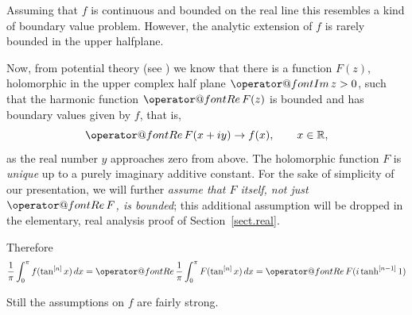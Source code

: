 \documentclass{amsart}
\makeatletter
\theoremstyle{plain}
\numberwithin{equation}{section}
\newcommand{\R}{{\mathbb  R}}
\renewcommand{\Re}{{\operator@font Re\,}}
\renewcommand{\Im}{{\operator@font Im\,}}
\makeatother
\begin{document}
Assuming that $f$ is continuous and bounded on the real line this resembles a kind of boundary value problem. However, the analytic extension of $f$ is rarely bounded in the upper halfplane.

Now, from potential theory (see \cite[Thms. 15.1a, 15.4d]{Hen}) we know that there is a function $F(z)$, holomorphic
in the upper complex half plane $\Im z >0$, such that the harmonic function $\Re F(z)$ is bounded and has boundary values given by $f$, that is,
\begin{equation}\label{eq.F}
\Re F(x+ i y) \to f(x), \qquad x\in\R,
\end{equation}
as the real number $y$ approaches zero from above. The holomorphic function $F$ is \emph{unique}
up to a purely imaginary additive constant. For the sake of simplicity of our presentation, we will further
{\em assume that $F$ itself, not just $\Re F$, is bounded}\/; this additional assumption will be dropped
in the elementary, real analysis proof of Section~\ref{sect.real}.

Therefore
\[
\frac{1}{\pi}\int_0^\pi f(\tan^{[n]}x)\,dx = \Re \frac{1}{\pi} \int_0^\pi F(\tan^{[n]}x)\,dx = \Re F(i \tanh^{[n-1]}1)
\]

Still the assumptions on $f$ are fairly strong. 


\end{document}
